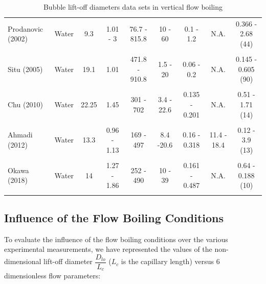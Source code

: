 \begin{table}[h!]
{\begin{tabular}{p{20mm}|c c c c c c c c}
\\
Prodanovic \cite{prodanovic_bubble_2002} \newline (2002) & Water & 9.3 & 1.01 - 3 & 76.7 - 815.8 & 10 - 60 & 0.1 - 1.2 & N.A. & 0.366 - 2.68 (44)\\
\\
Situ \cite{situ_bubble_2005} \newline (2005)& Water & 19.1 & 1.01 & 471.8 - 910.8 & 1.5 - 20 & 0.06 - 0.2 & N.A. & 0.145 - 0.605  (90)\\
\\
Chu \cite{chu_bubble_2011} \newline (2010) & Water & 22.25 & 1.45 & 301 - 702 & 3.4 - 22.6 & 0.135 - 0.201 &  N.A. & 0.51 - 1.71 (14) \\
\\
Ahmadi \cite{ahmadi_bubble_2012} \newline (2012) & Water & 13.3 & 0.96 - 1.13 & 169 - 497 & 8.4 -20.6 & 0.16 - 0.318 &  11.4 - 18.4 & 0.12 - 3.9 (13) \\
\\
Okawa \cite{okawa_observation_2018} \newline (2018) & Water & 14 & 1.27 - 1.86 & 252 - 490 & 10 - 39 & 0.161 - 0.487 &  N.A. & 0.64 - 0.188 (10) \\
\\
\hline
\end{tabular}
}


\caption{Bubble lift-off diameters data sets in vertical flow boiling}
\label{tab:exp_data_dlo}


\end{table}

\subsection{Influence of the Flow Boiling Conditions}


To evaluate the influence of the flow boiling conditions over the various experimental measurements, we have represented the values of the non-dimensional lift-off diameter $\dfrac{D_{lo}}{L_{c}}$ ($L_{c}$ is the capillary length) versus 6 dimensionless flow parameters:

